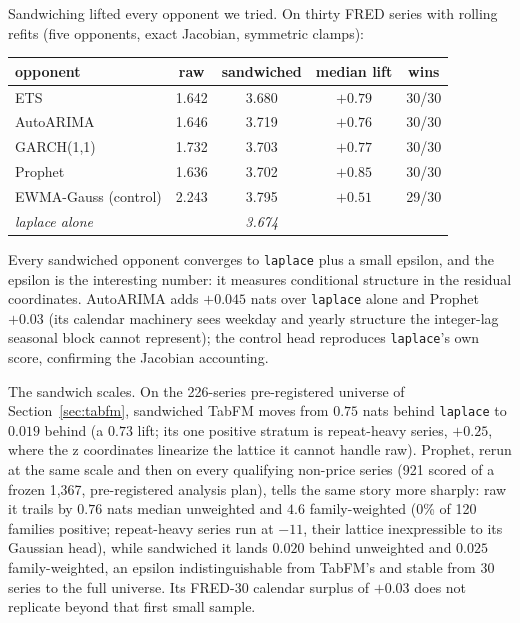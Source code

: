 \documentclass[article]{jss}
\providecommand{\code}[1]{\texttt{#1}}
\begin{document}
Sandwiching lifted every opponent we tried. On thirty FRED series with
rolling refits (five opponents, exact Jacobian, symmetric clamps):

\begin{center}
\begin{tabular}{lcccc}
\hline
opponent & raw & sandwiched & median lift & wins \\
\hline
ETS               & 1.642 & 3.680 & $+0.79$ & 30/30 \\
AutoARIMA         & 1.646 & 3.719 & $+0.76$ & 30/30 \\
GARCH(1,1)        & 1.732 & 3.703 & $+0.77$ & 30/30 \\
Prophet           & 1.636 & 3.702 & $+0.85$ & 30/30 \\
EWMA-Gauss (control) & 2.243 & 3.795 & $+0.51$ & 29/30 \\
\emph{laplace alone} & & \emph{3.674} & & \\
\hline
\end{tabular}
\end{center}

Every sandwiched opponent converges to \code{laplace} plus a small
epsilon, and the epsilon is the interesting number: it measures
conditional structure in the residual coordinates. AutoARIMA adds
$+0.045$ nats over \code{laplace} alone and Prophet $+0.03$ (its
calendar machinery sees weekday and yearly structure the integer-lag
seasonal block cannot represent); the control head reproduces
\code{laplace}'s own score, confirming the Jacobian accounting.

The sandwich scales. On the 226-series pre-registered universe of
Section~\ref{sec:tabfm}, sandwiched TabFM moves from $0.75$ nats behind
\code{laplace} to $0.019$ behind (a $0.73$ lift; its one positive
stratum is repeat-heavy series, $+0.25$, where the z coordinates
linearize the lattice it cannot handle raw). Prophet, rerun at the same
scale and then on every qualifying non-price series (921 scored of a
frozen 1,367, pre-registered analysis plan), tells the same story more
sharply: raw it trails by $0.76$ nats median unweighted and $4.6$
family-weighted (0\% of 120 families positive; repeat-heavy series run
at $-11$, their lattice inexpressible to its Gaussian head), while
sandwiched it lands $0.020$ behind unweighted and $0.025$
family-weighted, an epsilon indistinguishable from TabFM's and stable
from 30 series to the full universe. Its FRED-30 calendar surplus of
$+0.03$ does not replicate beyond that first small sample.
\end{document}
